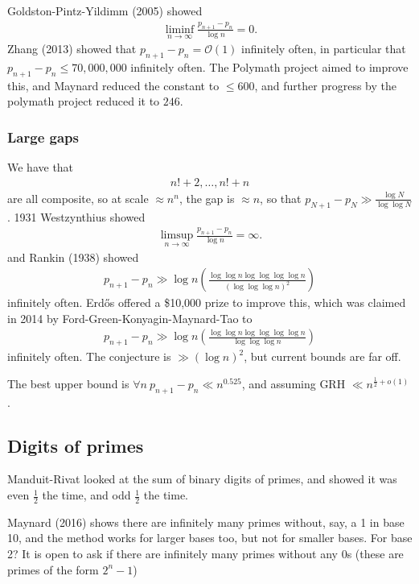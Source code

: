 \documentclass{article}
\newcommand{\1}{\mathbbm{1}}
\newcommand{\bigO}{\mathcal{O}}
\begin{document}
Goldston-Pintz-Yildimm (2005) showed
\begin{align*}
  \liminf_{n \to \infty} \frac{p_{n+1} - p_n}{\log n} = 0.
\end{align*}
Zhang (2013) showed that $p_{n+1} - p_n = \bigO(1)$ infinitely often, in particular that $p_{n+1} - p_n \leq 70,000,000$ infinitely often.
The Polymath project aimed to improve this, and Maynard reduced the constant to $\leq 600$, and further progress by the polymath project reduced it to $246$.

\subsubsection{Large gaps}
We have that
\begin{align*}
  n! + 2, \dotsc, n! + n
\end{align*}
are all composite, so at scale $\approx n^n$, the gap is $\approx n$, so that $p_{N+1} - p_N \gg \frac{\log N}{\log \log N}$.
1931 Westzynthius showed
\begin{align*}
  \limsup_{n \to \infty} \frac{p_{n+1} - p_n}{\log n} = \infty.
\end{align*}
and Rankin (1938) showed
\begin{align*}
  p_{n+1} - p_n \gg \log n \left(\frac{\log \log n \log \log \log \log n}{(\log \log \log n)^2}\right)
\end{align*}
infinitely often.
Erd\H{o}s offered a \$10,000 prize to improve this, which was claimed in 2014 by Ford-Green-Konyagin-Maynard-Tao to
\begin{align*}
  p_{n+1} - p_n \gg \log n \left(\frac{\log \log n \log \log \log \log n}{\log \log \log n}\right)
\end{align*}
infinitely often.
The conjecture is $\gg (\log n)^2$, but current bounds are far off.

The best upper bound is $\forall n \ p_{n+1} - p_n \ll n^{0.525}$, and assuming GRH $\ll n^{\frac 12 + o(1)}$.

\subsection{Digits of primes}
Manduit-Rivat looked at the sum of binary digits of primes, and showed it was even $\frac 12$ the time, and odd $\frac 12$ the time.

Maynard (2016) shows there are infinitely many primes without, say, a 1 in base 10, and the method works for larger bases too, but not for smaller bases.
For base 2? It is open to ask if there are infinitely many primes without any 0s (these are primes of the form $2^n - 1$)
\end{document}
